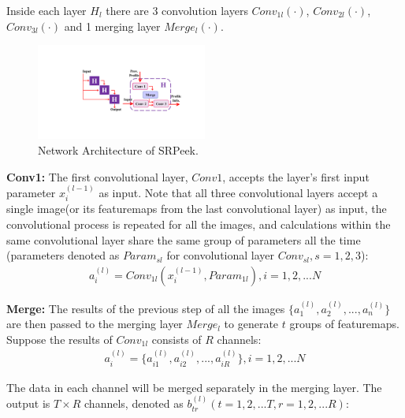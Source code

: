 Inside each layer $H_l$ there are 3 convolution layers $Conv_{1l}(\cdot)$, $Conv_{2l}(\cdot)$, $Conv_{3l}(\cdot)$ and 1 merging layer $Merge_l(\cdot)$.

\begin{figure}
    \centering
       \includegraphics[width=0.5\textwidth]{./pic/network.pdf}
       \caption{Network Architecture of SRPeek.}
       \label{fig-system}
   \end{figure}   

\vspace{1mm}
\noindent
\textbf{Conv1:} The first convolutional layer, $Conv1$, accepts the layer's first input parameter $x_i^{(l-1)}$ as input. Note that all three convolutional layers accept a single image(or its featuremaps from the last convolutional layer) as input, the convolutional process is repeated for all the images, and calculations within the same convolutional layer share the same group of parameters all the time (parameters denoted as $Param_{sl}$ for convolutional layer $Conv_{sl}, s=1,2,3$):
\begin{equation}\label{eq:4}
    \begin{split}
        a_i^{(l)} = Conv_{1l}(x_i^{(l-1)},Param_{1l}), i=1,2,...N
\end{split}
\end{equation}

\vspace{1mm}
\noindent
\textbf{Merge:} The results of the previous step of all the images $\{a_1^{(l)},a_2^{(l)},...,a_n^{(l)}\}$ are then passed to the merging layer $Merge_l$ to generate $t$ groups of featuremaps. Suppose the results of $Conv_{1l}$ consists of $R$ channels:
\begin{equation}\label{eq:5}
    \begin{split}
        a_i^{(l)} = \{a_{i1}^{(l)},a_{i2}^{(l)},...,a_{iR}^{(l)}\}, i=1,2,...N
\end{split}
\end{equation}

The data in each channel will be merged separately in the merging layer. The output is $T\times R$ channels, denoted as $b_{tr}^{(l)}(t=1,2,...T, r=1,2,...R)$:

